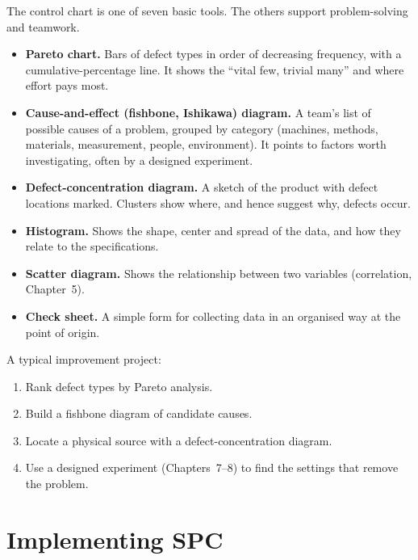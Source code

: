 The control chart is one of seven basic tools. The others support problem-solving and teamwork.
\begin{itemize}
  \item \textbf{Pareto chart.} Bars of defect types in order of decreasing frequency, with a cumulative-percentage line. It shows the ``vital few, trivial many'' and where effort pays most.
  \item \textbf{Cause-and-effect (fishbone, Ishikawa) diagram.} A team's list of possible causes of a problem, grouped by category (machines, methods, materials, measurement, people, environment). It points to factors worth investigating, often by a designed experiment.
  \item \textbf{Defect-concentration diagram.} A sketch of the product with defect locations marked. Clusters show where, and hence suggest why, defects occur.
  \item \textbf{Histogram.} Shows the shape, center and spread of the data, and how they relate to the specifications.
  \item \textbf{Scatter diagram.} Shows the relationship between two variables (correlation, Chapter~5).
  \item \textbf{Check sheet.} A simple form for collecting data in an organised way at the point of origin.
\end{itemize}
A typical improvement project:
\begin{enumerate}
  \item Rank defect types by Pareto analysis.
  \item Build a fishbone diagram of candidate causes.
  \item Locate a physical source with a defect-concentration diagram.
  \item Use a designed experiment (Chapters~7--8) to find the settings that remove the problem.
\end{enumerate}

\section{Implementing SPC}

